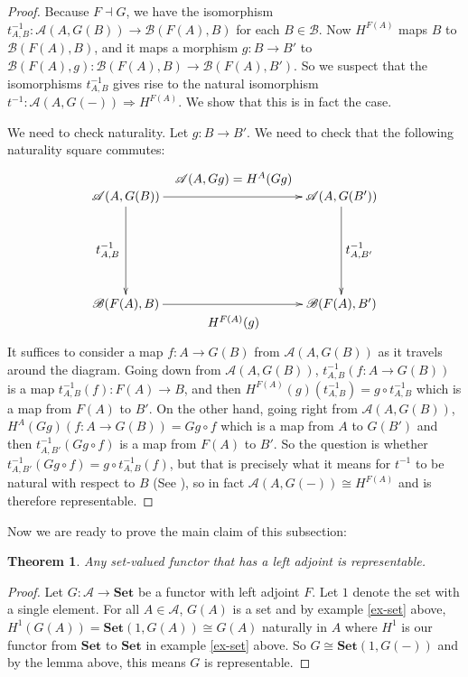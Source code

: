 \documentclass[11pt]{article}
\theoremstyle{definition}
\theoremstyle{definition}
\theoremstyle{plain}
\newtheorem{theo}{Theorem}
\theoremstyle{plain}
\theoremstyle{plain}
\begin{document}
\begin{proof}
Because $F \dashv G$, we have the isomorphism $t^{-1}_{A,B}: \mathscr{A}(A, G(B)) \to \mathscr{B}(F(A), B)$ for each $B \in \mathscr{B}$. Now $H^{F(A)}$ maps $B$ to $\mathscr{B}(F(A),B)$, and it maps a morphism $g: B \to B'$ to $\mathscr{B}(F(A),g):\mathscr{B}(F(A),B) \to \mathscr{B}(F(A),B')$. So we suspect that the isomorphisms $t^{-1}_{A,B}$ gives rise to the natural isomorphism $t^{-1}:\mathscr{A}(A,G(-)) \Rightarrow H^{F(A)}$. We show that this is in fact the case.

We need to check naturality. Let $g:B \to B'$. We need to check that the following naturality square commutes:

\begin{equation*}
\begin{xy}
(0,0)*+{\mathscr{A}(A, G(B))}="v1"; (60,0)*+{\mathscr{A}(A, G(B'))}="v2"; (0,-30)*+{\mathscr{B}(F(A), B)}="v3"; (60,-30)*+{\mathscr{B}(F(A), B')}="v4";
{\ar "v1";"v2"}?*!/_5mm/{\mathscr{A}(A, Gg)=H^{A}(Gg)};
{\ar "v1";"v3"}?*!/^5mm/{t^{-1}_{A,B}};
{\ar "v2";"v4"}?*!/_5mm/{t^{-1}_{A,B'}};
{\ar "v3";"v4"}?*!/^5mm/{H^{F(A)}(g)};
\end{xy}
\end{equation*}

It suffices to consider a map $f: A \to G(B)$ from $\mathscr{A}(A,G(B))$ as it travels around the diagram. Going down from $\mathscr{A}(A,G(B))$, $t^{-1}_{A,B}(f:A \to G(B))$ is a map $t^{-1}_{A,B}(f):F(A) \to B$, and then $H^{F(A)}(g)(t^{-1}_{A,B}) = g \circ t^{-1}_{A,B}$ which is a map from $F(A)$ to $B'$. On the other hand, going right from $\mathscr{A}(A,G(B))$, $H^{A}(Gg)(f:A \to G(B)) = Gg \circ f$ which is a map from $A$ to $G(B')$ and then $t^{-1}_{A,B'}(Gg \circ f)$ is a map from $F(A)$ to $B'$. So the question is whether $t^{-1}_{A,B'}(Gg \circ f) = g \circ t^{-1}_{A,B}(f)$, but that is precisely what it means for $t^{-1}$ to be natural with respect to $B$ (See \cite{liu_adjoints_2018}), so in fact $\mathscr{A}(A,G(-)) \cong H^{F(A)}$ and is therefore representable.
\end{proof}

Now we are ready to prove the main claim of this subsection:

\begin{theo}
Any set-valued functor that has a left adjoint is representable.
\end{theo}

\begin{proof}
Let $G:\mathscr{A}\to\textbf{Set}$ be a functor with left adjoint $F$. Let $1$ denote the set with a single element. For all $A \in \mathscr{A}$, $G(A)$ is a set and by example \ref{ex-set} above, $H^{1}(G(A)) = \textbf{Set}(1, G(A)) \cong G(A)$ naturally in $A$ where $H^{1}$ is our functor from $\textbf{Set}$ to $\textbf{Set}$ in example \ref{ex-set} above. So $G \cong \textbf{Set}(1, G(-))$ and by the lemma above, this means $G$ is representable.
\end{proof}

\nocite{*}


\end{document}
